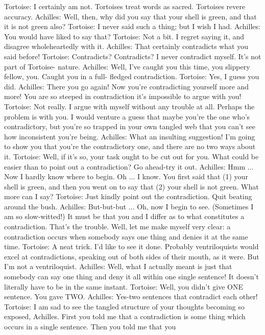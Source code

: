 Tortoise: I certainly am not. Tortoises treat words as sacred. Tortoises revere accuracy.
Achilles: Well, then, why did you say that your shell is green, and that it is not green
       also?
Tortoise: I never said such a thing; but I wish I had. Achilles: You would have liked to
       say that?
Tortoise: Not a bit. I regret saying it, and disagree wholeheartedly with it. Achilles: That
       certainly contradicts what you said before!
Tortoise: Contradicts? Contradicts? I never contradict myself. It's not part of Tortoise-
       nature.
Achilles: Well, I've caught you this time, you slippery fellow, you. Caught you in a full-
       fledged contradiction.
Tortoise: Yes, I guess you did.
Achilles: There you go again! Now you're contradicting yourself more and more! You are
       so steeped in contradiction it's impossible to argue with you!
Tortoise: Not really. I argue with myself without any trouble at all. Perhaps the problem
       is with you. I would venture a guess that maybe you're the one who's
       contradictory, but you're so trapped in your own tangled web that you can't see
       how inconsistent you're being.
Achilles: What an insulting suggestion! I'm going to show you that you're the
       contradictory one, and there are no two ways about it.
Tortoise: Well, if it's so, your task ought to be cut out for you. What could be easier than
       to point out a contradiction? Go ahead-try it out.
Achilles: Hmm ... Now I hardly know where to begin. Oh ... I know. You first said that
       (1) your shell is green, and then you went on to say that (2) your shell is not
       green. What more can I say?
Tortoise: Just kindly point out the contradiction. Quit beating around the bush.
Achilles: But-but-but ... Oh, now I begin to see. (Sometimes I am so slow-witted!) It must
       be that you and I differ as to what constitutes a contradiction. That's the trouble.
       Well, let me make myself very clear: a contradiction occurs when somebody says
       one thing and denies it at the same time.
Tortoise: A neat trick. I'd like to see it done. Probably ventriloquists would excel at
       contradictions, speaking out of both sides of their mouth, as it were. But I'm not a
       ventriloquist.
Achilles: Well, what I actually meant is just that somebody can say one thing and deny it
       all within one single sentence! It doesn't literally have to be in the same instant.
Tortoise: Well, you didn't give ONE sentence. You gave TWO.
Achilles: Yes-two sentences that contradict each other!
Tortoise: I am sad to see the tangled structure of your thoughts becoming so exposed,
       Achilles. First you told me that a contradiction is some thing which occurs in a
       single sentence. Then you told me that you

